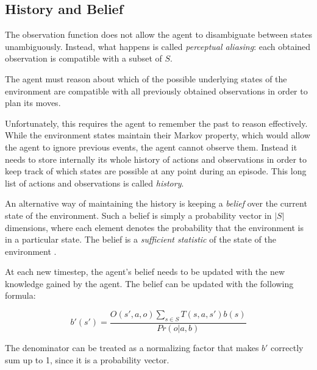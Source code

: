 %

\subsection{History and Belief}

The observation function does not allow the agent to disambiguate between states unambiguously.
Instead, what happens is called \textit{perceptual aliasing}: each obtained observation is
compatible with a subset of $S$.

The agent must reason about which of the possible underlying states of the environment are
compatible with all previously obtained observations in order to plan its moves.

Unfortunately, this requires the agent to remember the past to reason effectively. While the
environment states maintain their Markov property, which would allow the agent to ignore previous
events, the agent cannot observe them. Instead it needs to store internally its whole history of
actions and observations in order to keep track of which states are possible at any point during an
episode. This long list of actions and observations is called \textit{history}.

An alternative way of maintaining the history is keeping a \textit{belief} over the current state of
the environment. Such a belief is simply a probability vector in $|S|$ dimensions, where each
element denotes the probability that the environment is in a particular state. The belief is a
\textit{sufficient statistic} of the state of the environment \cite{cit:pomdp}.

At each new timestep, the agent's belief needs to be updated with the new knowledge gained by the
agent. The belief can be updated with the following formula:

\begin{equation}
 b'(s') = \frac{O(s', a, o)\sum_{s\in S}T(s,a,s')b(s)}{Pr(o|a,b)}
\end{equation}

The denominator can be treated as a normalizing factor that makes $b'$ correctly sum up to 1, since
it is a probability vector.

